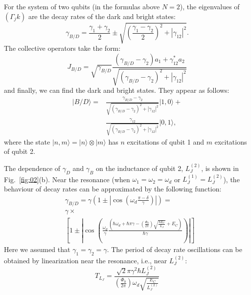 \documentclass[lettersize,journal]{IEEEtran}
\begin{document}
For the system of two qubits (in the formulas above $N=2$), the eigenvalues of $(\Gamma_jk)$ are the decay rates of the dark and bright states:
\begin{equation} \label{eq:11}
    \gamma_{B/D} = \frac{\gamma_1 + \gamma_2}{2} \pm \sqrt{\left(\frac{\gamma_1 - \gamma_2}{2}\right)^2 + |\gamma_{12}|^2}.
\end{equation}
The collective operators take the form:
\begin{equation} \label{eq:12}
    J_{B/D} = \sqrt{\gamma_{B/D}} \frac{(\gamma_{B/D} - \gamma_2) a_1 + \gamma_{12}^* a_2}{\sqrt{(\gamma_{B/D} - \gamma_2)^2 + |\gamma_{12}|^2}}
\end{equation}
and finally, we can find the dark and bright states.
They appear as follows:
\begin{equation}  \label{eq:13}
    \begin{aligned}
        |B/D\rangle =& \frac{\gamma_{B/D} - \gamma_2}{\sqrt{(\gamma_{B/D} - \gamma_2)^2 + |\gamma_{12}|^2}} |1,0\rangle + \\
        &\frac{\gamma_{12}}{\sqrt{(\gamma_{B/D} - \gamma_2)^2 + |\gamma_{12}|^2}} |0,1\rangle,
    \end{aligned}
\end{equation}
where the state $|n,m\rangle = |n\rangle \otimes |m\rangle$ has $n$ excitations of qubit 1 and $m$ excitations of qubit 2.

The dependence of $\gamma_D$ and $\gamma_B$ on the inductance of qubit 2, $L_J^{(2)}$, is shown in Fig.~\ref{fig:02}(b).
Near the resonance (when $\omega_1 = \omega_2 = \omega_d$ or $L_J^{(1)} = L_J^{(2)}$), the behaviour of decay rates can be approximated by the following function:
\begin{equation} \label{eq:14}
\begin{aligned}
    &\gamma_{B/D} = \gamma \left(1 \pm \left|\cos\left( \omega_d \frac{\pi - \delta}{\gamma} \right) \right| \right) = \\
    &\gamma \times \\
    &\left[ 1 \pm \left| \cos \left( \frac{\omega _d}{\gamma} \frac{\left(\hbar  \omega _d +\hbar \pi \gamma - \left( \frac{\Phi_0}{2\pi} \right) \sqrt{\frac{8 E_C}{L_J}}+E_C\right)}{\hbar \gamma}\right) \right| \right]
\end{aligned}
\end{equation}
Here we assumed that $\gamma_1 =  \gamma_2 = \gamma$.
The period of decay rate oscillations can be obtained by linearization near the resonance, i.e., near $L_J^{(2)}$:
\begin{equation} \label{eq:15}
    T_{L_J} = \frac{\sqrt{2} \pi  \gamma ^2 \hbar  L_J^{(2)}}{\left( \frac{\Phi_0}{2\pi} \right) \omega_d \sqrt{\frac{E_C}{L_J^{(2)}}}}
\end{equation}
\end{document}
